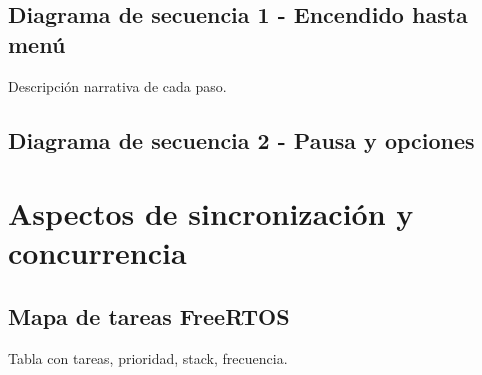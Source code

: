 \documentclass[11pt,a4paper]{article}
\begin{document}




\subsection{Diagrama de secuencia 1 - Encendido hasta menú}
Descripción narrativa de cada paso.

\subsection{Diagrama de secuencia 2 - Pausa y opciones}

\section{Aspectos de sincronización y concurrencia}
\subsection{Mapa de tareas FreeRTOS}
Tabla con tareas, prioridad, stack, frecuencia.
\end{document}
